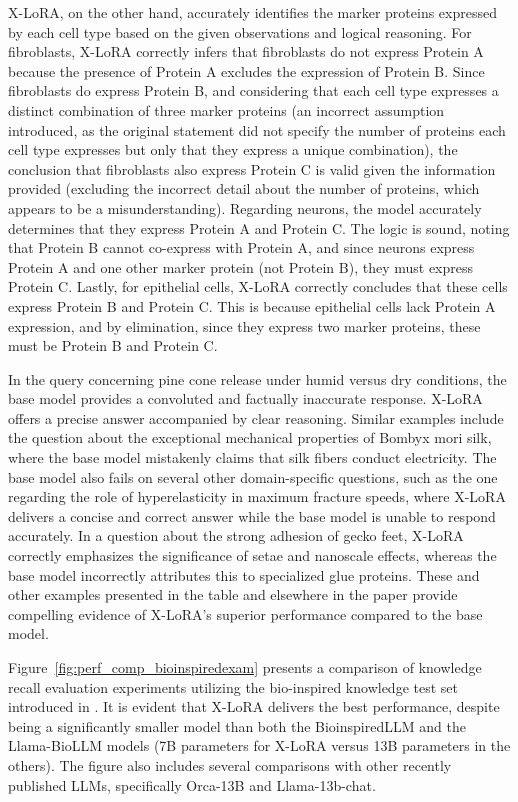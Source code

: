 X-LoRA, on the other hand, accurately identifies the marker proteins expressed by each cell type based on the given observations and logical reasoning. For fibroblasts, X-LoRA correctly infers that fibroblasts do not express Protein A because the presence of Protein A excludes the expression of Protein B. Since fibroblasts do express Protein B, and considering that each cell type expresses a distinct combination of three marker proteins (an incorrect assumption introduced, as the original statement did not specify the number of proteins each cell type expresses but only that they express a unique combination), the conclusion that fibroblasts also express Protein C is valid given the information provided (excluding the incorrect detail about the number of proteins, which appears to be a misunderstanding). Regarding neurons, the model accurately determines that they express Protein A and Protein C. The logic is sound, noting that Protein B cannot co-express with Protein A, and since neurons express Protein A and one other marker protein (not Protein B), they must express Protein C. Lastly, for epithelial cells, X-LoRA correctly concludes that these cells express Protein B and Protein C. This is because epithelial cells lack Protein A expression, and by elimination, since they express two marker proteins, these must be Protein B and Protein C.

In the query concerning pine cone release under humid versus dry conditions, the base model provides a convoluted and factually inaccurate response. X-LoRA offers a precise answer accompanied by clear reasoning. Similar examples include the question about the exceptional mechanical properties of Bombyx mori silk, where the base model mistakenly claims that silk fibers conduct electricity. The base model also fails on several other domain-specific questions, such as the one regarding the role of hyperelasticity in maximum fracture speeds, where X-LoRA delivers a concise and correct answer while the base model is unable to respond accurately. In a question about the strong adhesion of gecko feet, X-LoRA correctly emphasizes the significance of setae and nanoscale effects, whereas the base model incorrectly attributes this to specialized glue proteins. These and other examples presented in the table and elsewhere in the paper provide compelling evidence of X-LoRA’s superior performance compared to the base model.

Figure~\ref{fig:perf_comp_bioinspiredexam} presents a comparison of knowledge recall evaluation experiments utilizing the bio-inspired knowledge test set introduced in \cite{Luu2023BioinspiredLLM:Materials}. It is evident that X-LoRA delivers the best performance, despite being a significantly smaller model than both the BioinspiredLLM and the Llama-BioLLM models (7B parameters for X-LoRA versus 13B parameters in the others). The figure also includes several comparisons with other recently published LLMs, specifically Orca-13B and Llama-13b-chat.

